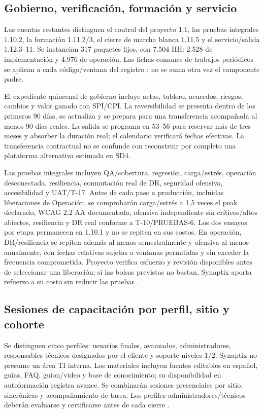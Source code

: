 \subsection{Gobierno, verificación, formación y servicio}
Las cuentas restantes distinguen el control del proyecto 1.1, las pruebas integrales 1.10.2, la formación 1.11.2/3, el cierre de marcha blanca 1.11.5 y el servicio/salida 1.12.3--11. Se instancian 317 paquetes fijos, con 7.504 HH: 2.528 de implementación y 4.976 de operación. Las fichas comunes de trabajos periódicos se aplican a cada código/ventana del registro ; no se suma otra vez el componente padre.

El expediente quincenal de gobierno incluye actas, tablero, acuerdos, riesgos, cambios y valor ganado con SPI/CPI. La reversibilidad se presenta dentro de los primeros 90 días, se actualiza y se prepara para una transferencia acompañada al menos 90 días reales. La salida se programa en 53--56 para reservar más de tres meses y absorber la duración real; el calendario verificará fechas efectivas. La transferencia contractual no se confunde con reconstruir por completo una plataforma alternativa estimada en SD4.

Las pruebas integrales incluyen QA/cobertura, regresión, carga/estrés, operación desconectada, resiliencia, conmutación real de DR, seguridad ofensiva, accesibilidad y UAT/T-17. Antes de cada paso a producción, incluidas liberaciones de Operación, se comprobarán carga/estrés a 1,5 veces el peak declarado, WCAG 2.2 AA documentada, ofensiva independiente sin críticos/altos abiertos, resiliencia y DR real conforme a T-10/PRUEBAS-6. Los dos ensayos por etapa permanecen en 1.10.1 y no se repiten en sus costos. En operación, DR/resiliencia se repiten además al menos semestralmente y ofensiva al menos anualmente, con fechas relativas sujetas a ventanas permitidas y sin exceder la frecuencia comprometida. Proyecto verifica esfuerzo y revisión disponibles antes de seleccionar una liberación; si las bolsas previstas no bastan, Synaptix aporta refuerzo a su costo sin reducir las pruebas \parencite[cap.~20, secc.~20.1, pp.~34--35]{bases-transversales}.

\subsection{Sesiones de capacitación por perfil, sitio y cohorte}
Se distinguen cinco perfiles: usuarios finales, avanzados, administradores, responsables técnicos designados por el cliente y soporte niveles 1/2. Synaptix no presume un área TI interna. Los materiales incluyen fuentes editables en español, guías, FAQ, guion/video y base de conocimiento; su disponibilidad en autoformación registra avance. Se combinarán sesiones presenciales por sitio, sincrónicas y acompañamiento de tarea. Los perfiles administradores/técnicos deberán evaluarse y certificarse antes de cada cierre \parencite[RT-22.01--07; p.~38]{bases-transversales}.

